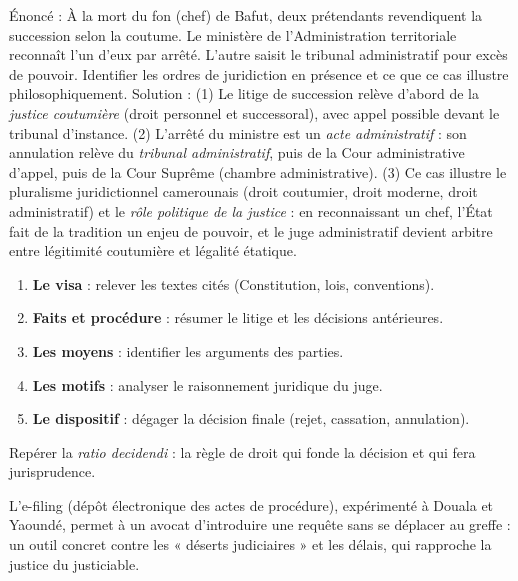 \documentclass[11pt]{article}
\newcommand{\cle}[1]{{\popxbold\color{popdark}#1}}
\begin{document}
\begin{exoresolu}
Énoncé : À la mort du fon (chef) de Bafut, deux prétendants revendiquent la succession selon la coutume. Le ministère de l'Administration territoriale reconnaît l'un d'eux par arrêté. L'autre saisit le tribunal administratif pour excès de pouvoir. Identifier les ordres de juridiction en présence et ce que ce cas illustre philosophiquement.
\tcblower
Solution : (1) Le litige de succession relève d'abord de la \emph{justice coutumière} (droit personnel et successoral), avec appel possible devant le tribunal d'instance. (2) L'arrêté du ministre est un \emph{acte administratif} : son annulation relève du \emph{tribunal administratif}, puis de la Cour administrative d'appel, puis de la Cour Suprême (chambre administrative). (3) Ce cas illustre le \cle{pluralisme juridictionnel} camerounais (droit coutumier, droit moderne, droit administratif) et le \emph{rôle politique de la justice} : en reconnaissant un chef, l'État fait de la tradition un enjeu de pouvoir, et le juge administratif devient arbitre entre légitimité coutumière et légalité étatique.
\end{exoresolu}

\begin{methode}
\begin{enumerate}
\item \textbf{Le visa} : relever les textes cités (Constitution, lois, conventions).
\item \textbf{Faits et procédure} : résumer le litige et les décisions antérieures.
\item \textbf{Les moyens} : identifier les arguments des parties.
\item \textbf{Les motifs} : analyser le raisonnement juridique du juge.
\item \textbf{Le dispositif} : dégager la décision finale (rejet, cassation, annulation).
\end{enumerate}
Repérer la \emph{ratio decidendi} : la règle de droit qui fonde la décision et qui fera jurisprudence.
\end{methode}

\begin{savaistu}
L'e-filing (dépôt électronique des actes de procédure), expérimenté à Douala et Yaoundé, permet à un avocat d'introduire une requête sans se déplacer au greffe : un outil concret contre les « déserts judiciaires » et les délais, qui rapproche la justice du justiciable.
\end{savaistu}
\end{document}
